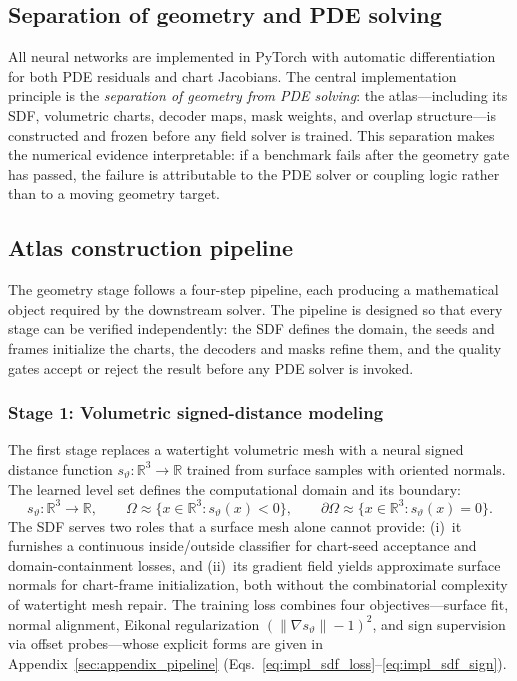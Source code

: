\documentclass[sort&compress]{svjour3} %
\begin{document}
\subsection{Separation of geometry and PDE solving}

All neural networks are implemented in PyTorch \citep{paszke2019pytorch} with automatic differentiation for both PDE residuals and chart Jacobians. The central implementation principle is the \emph{separation of geometry from PDE solving}: the atlas---including its SDF, volumetric charts, decoder maps, mask weights, and overlap structure---is constructed and frozen before any field solver is trained. This separation makes the numerical evidence interpretable: if a benchmark fails after the geometry gate has passed, the failure is attributable to the PDE solver or coupling logic rather than to a moving geometry target.

\subsection{Atlas construction pipeline}
\label{sec:impl_pipeline}

The geometry stage follows a four-step pipeline, each producing a mathematical object required by the downstream solver. The pipeline is designed so that every stage can be verified independently: the SDF defines the domain, the seeds and frames initialize the charts, the decoders and masks refine them, and the quality gates accept or reject the result before any PDE solver is invoked.

\subsubsection{Stage 1: Volumetric signed-distance modeling}
\label{sec:impl_sdf}

The first stage replaces a watertight volumetric mesh with a neural signed distance function $s_\vartheta:\mathbb{R}^3\to\mathbb{R}$ trained from surface samples with oriented normals. The learned level set defines the computational domain and its boundary:
\begin{equation}
s_{\vartheta}:\mathbb{R}^3\rightarrow \mathbb{R},
\qquad
\Omega \approx \{x\in\mathbb{R}^3:s_{\vartheta}(x)<0\},
\qquad
\partial\Omega \approx \{x\in\mathbb{R}^3:s_{\vartheta}(x)=0\}.
\label{eq:impl_sdf_levelset}
\end{equation}
The SDF serves two roles that a surface mesh alone cannot provide: (i)~it furnishes a continuous inside/outside classifier for chart-seed acceptance and domain-containment losses, and (ii)~its gradient field yields approximate surface normals for chart-frame initialization, both without the combinatorial complexity of watertight mesh repair. The training loss combines four objectives---surface fit, normal alignment, Eikonal regularization $(\|\nabla s_\vartheta\|-1)^2$, and sign supervision via offset probes---whose explicit forms are given in Appendix~\ref{sec:appendix_pipeline} (Eqs.~\eqref{eq:impl_sdf_loss}--\eqref{eq:impl_sdf_sign}).
\end{document}

